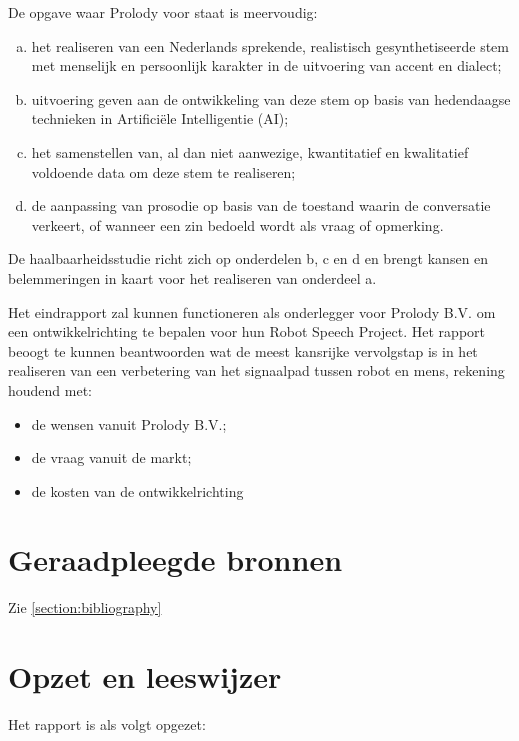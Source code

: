 De opgave waar Prolody voor staat is meervoudig:
\begin{enumerate}[a)]
    \item het realiseren van een Nederlands sprekende, realistisch gesynthetiseerde stem met menselijk en persoonlijk karakter in de uitvoering van accent en dialect;
    \item uitvoering geven aan de ontwikkeling van deze stem op basis van hedendaagse technieken in Artificiële Intelligentie (AI);
    \item het samenstellen van, al dan niet aanwezige, kwantitatief en kwalitatief voldoende data om deze stem te realiseren;
    \item de aanpassing van prosodie op basis van de toestand waarin de conversatie verkeert, of wanneer een zin bedoeld wordt als vraag of opmerking.
\end{enumerate}

De haalbaarheidsstudie richt zich op onderdelen b, c en d en brengt kansen en belemmeringen in kaart voor het realiseren van onderdeel a.

Het eindrapport zal kunnen functioneren als onderlegger voor Prolody B.V. om een ontwikkelrichting te bepalen voor hun Robot Speech Project. Het rapport beoogt te kunnen beantwoorden wat de meest kansrijke vervolgstap is in het realiseren van een verbetering van het signaalpad tussen robot en mens, rekening houdend met:
\begin{itemize}
    \item de wensen vanuit Prolody B.V.;
    \item de vraag vanuit de markt;
    \item de kosten van de ontwikkelrichting
\end{itemize}

\section{Geraadpleegde bronnen}

Zie \ref{section:bibliography}

\section{Opzet en leeswijzer}
Het rapport is als volgt opgezet:
